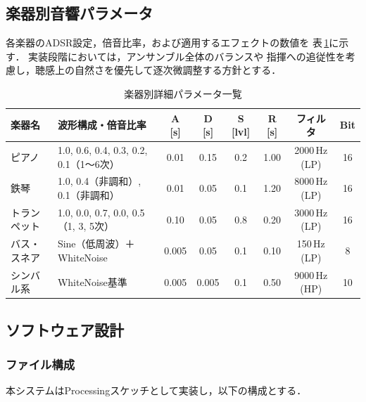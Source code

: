 \documentclass[lualatex,book,paper=a4paper,jafontsize=11.5pt,jafontscale=1.05,oneside]{jlreq}
\begin{document}
\subsection{楽器別音響パラメータ}

各楽器のADSR設定，倍音比率，および適用するエフェクトの数値を
表\,\ref{tab:adsr_params}に示す．
実装段階においては，アンサンブル全体のバランスや
指揮への追従性を考慮し，聴感上の自然さを優先して逐次微調整する方針とする．

\begin{table}[h]
  \centering
  \caption{楽器別詳細パラメータ一覧}
  \label{tab:adsr_params}
  \small
  \begin{tabular}{lp{4.5cm}cccccc}
    \hline
    楽器名 & 波形構成・倍音比率 & A {[s]} & D {[s]} & S {[lvl]} & R {[s]} & フィルタ & Bit \\
    \hline
    ピアノ
      & 1.0, 0.6, 0.4, 0.3, 0.2, 0.1（1〜6次）
      & 0.01 & 0.15 & 0.2 & 1.00 & 2000\,Hz (LP) & 16 \\
    鉄琴
      & 1.0, 0.4（非調和）, 0.1（非調和）
      & 0.01 & 0.05 & 0.1 & 1.20 & 8000\,Hz (LP) & 16 \\
    トランペット
      & 1.0, 0.0, 0.7, 0.0, 0.5（1, 3, 5次）
      & 0.10 & 0.05 & 0.8 & 0.20 & 3000\,Hz (LP) & 16 \\
    バス・スネア
      & Sine（低周波）＋ WhiteNoise
      & 0.005 & 0.05 & 0.1 & 0.10 & 150\,Hz (LP) & 8 \\
    シンバル系
      & WhiteNoise基準
      & 0.005 & 0.005 & 0.1 & 0.50 & 9000\,Hz (HP) & 10 \\
    \hline
  \end{tabular}
\end{table}

\subsection{ソフトウェア設計}

\subsubsection{ファイル構成}

本システムはProcessingスケッチとして実装し，以下の構成とする．
\end{document}
